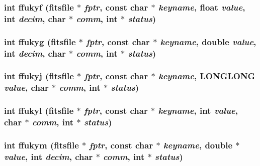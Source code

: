 \subsubsection{\setlength{\rightskip}{0pt plus 5cm}int ffukyf (\bf{fitsfile} $\ast$ {\em fptr}, const char $\ast$ {\em keyname}, float {\em value}, int {\em decim}, char $\ast$ {\em comm}, int $\ast$ {\em status})}\label{src_2fitsio_8h_7e2a06ea877d0f925b262790562ddfee}


\subsubsection{\setlength{\rightskip}{0pt plus 5cm}int ffukyg (\bf{fitsfile} $\ast$ {\em fptr}, const char $\ast$ {\em keyname}, double {\em value}, int {\em decim}, char $\ast$ {\em comm}, int $\ast$ {\em status})}\label{src_2fitsio_8h_5a1f266c010c12d806f4ce4798d09899}


\subsubsection{\setlength{\rightskip}{0pt plus 5cm}int ffukyj (\bf{fitsfile} $\ast$ {\em fptr}, const char $\ast$ {\em keyname}, \bf{LONGLONG} {\em value}, char $\ast$ {\em comm}, int $\ast$ {\em status})}\label{src_2fitsio_8h_bafdc68a536acb7394eecdff9716469d}


\subsubsection{\setlength{\rightskip}{0pt plus 5cm}int ffukyl (\bf{fitsfile} $\ast$ {\em fptr}, const char $\ast$ {\em keyname}, int {\em value}, char $\ast$ {\em comm}, int $\ast$ {\em status})}\label{src_2fitsio_8h_87a441e58e003c3ffe935433f47fe619}


\subsubsection{\setlength{\rightskip}{0pt plus 5cm}int ffukym (\bf{fitsfile} $\ast$ {\em fptr}, const char $\ast$ {\em keyname}, double $\ast$ {\em value}, int {\em decim}, char $\ast$ {\em comm}, int $\ast$ {\em status})}\label{src_2fitsio_8h_7f9c7ad3634517428c532d6cb125197c}


